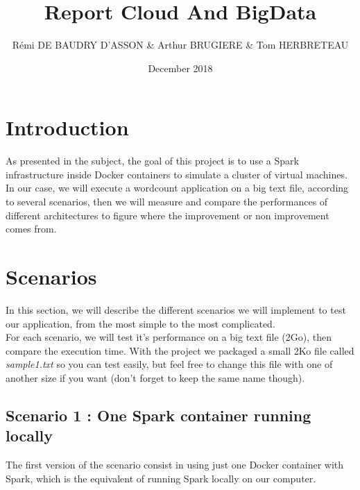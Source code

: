 \documentclass{article}
\title{Report Cloud And BigData}
\author{Rémi DE BAUDRY D'ASSON & Arthur BRUGIERE & Tom HERBRETEAU }
\date{December 2018}
\begin{document}
\maketitle

\section{Introduction}

As presented in the subject, the goal of this project is to use a Spark infrastructure inside Docker containers to simulate a cluster of virtual machines. \\

\noindent In our case, we will execute a wordcount application on a big text file, according to several scenarios, then we will measure and compare the performances of different architectures to figure where the improvement or non improvement comes from.

\section{Scenarios}

In this section, we will describe the different scenarios we will implement to test our application, from the most simple to the most complicated. \\

\noindent For each scenario, we will test it's performance on a big text file (2Go), then compare the execution time. With the project we packaged a small 2Ko file called \textit{sample1.txt} so you can test easily, but feel free to change this file with one of another size if you want (don't forget to keep the same name though).



\subsection{Scenario 1 : One Spark container running locally}

The first version of the scenario consist in using just one Docker container with Spark, which is the equivalent of running Spark locally on our computer. \\
\end{document}

